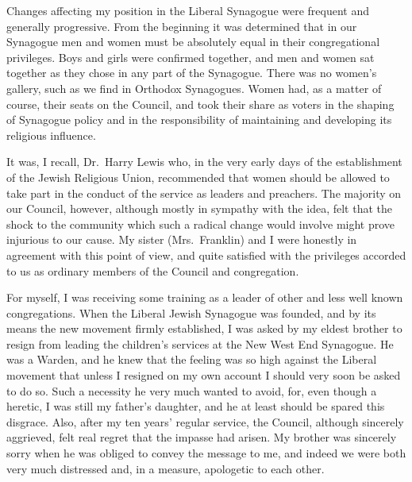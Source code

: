 Changes affecting my position in the Liberal Synagogue
were frequent and generally progressive. From
the beginning it was determined that in our Synagogue
men and women must be absolutely equal in their
congregational privileges. Boys and girls were confirmed
together, and men and women sat together as they chose
in any part of the Synagogue. There was no women’s
gallery, such as we find in Orthodox Synagogues. Women
had, as a matter of course, their seats on the Council,
and took their share as voters in the shaping of Synagogue
policy and in the responsibility of maintaining
and developing its religious influence.

It was, I recall, Dr.\ Harry Lewis who, in the very
early days of the establishment of the Jewish Religious
Union, recommended that women should be allowed to
take part in the conduct of the service as leaders and
preachers. The majority on our Council, however,
although mostly in sympathy with the idea, felt that the
shock to the community which such a radical change
would involve might prove injurious to our cause. My
sister (Mrs.\ Franklin) and I were honestly in agreement
with this point of view, and quite satisfied with the
privileges accorded to us as ordinary members of the
Council and congregation.

For myself, I was receiving some training as a leader
of other and less well known congregations. When the
Liberal Jewish Synagogue was founded, and by its
means the new movement firmly established, I was asked
by my eldest brother to resign from leading the children’s
services at the New West End Synagogue. He was a
Warden, and he knew that the feeling was so high against
the Liberal movement that unless I resigned on my own
account I should very soon be asked to do so. Such a
necessity he very much wanted to avoid, for, even
though a heretic, I was still my father’s daughter, and
he at least should be spared this disgrace. Also, after my
ten years’ regular service, the Council, although sincerely
aggrieved, felt real regret that the impasse had arisen.
My brother was sincerely sorry when he was obliged to
convey the message to me, and indeed we were both very
much distressed and, in a measure, apologetic to each
other.

